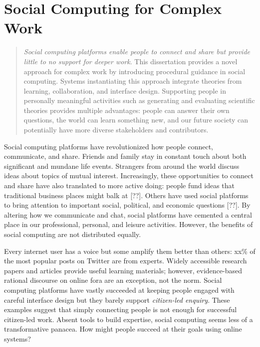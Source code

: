 \chapter{Social Computing for Complex Work}


\begin{quote}
\emph{Social computing platforms enable people to connect and share but provide little to no support for deeper work}. This dissertation provides a novel approach for complex work by introducing procedural guidance in social computing. Systems instantiating this approach integrate theories from learning, collaboration, and interface design. Supporting people in personally meaningful activities such as generating and evaluating scientific theories provides multiple advantages: people can answer their own questions, the world can learn something new, and our future society can potentially have more diverse stakeholders and contributors.
\end{quote}
\vspace{0.25in}

Social computing platforms have revolutionized how people connect, communicate, and share. Friends and family stay in constant touch about both significant and mundane life events. Strangers from around the world discuss ideas about topics of mutual interest. Increasingly, these opportunities to connect and share have also translated to more active doing: people fund ideas that traditional business places might balk at [??]. Others have used social platforms to bring attention to important social, political, and economic questions [??]. By altering how we communicate and chat, social platforms have cemented a central place in our professional, personal, and leisure activities. However, the benefits of social computing are not distributed equally. 

Every internet user has a voice but some amplify them better than others: xx\% of the most popular posts on Twitter are from experts. Widely accessible research papers and articles provide useful learning materials; however, evidence-based rational discourse on online fora are an exception, not the norm. Social computing platforms have vastly succeeded at keeping people engaged with careful interface design but they barely support \textit {citizen-led enquiry}. These examples suggest that simply connecting people is not enough for successful citizen-led work. Absent tools to build expertise, social computing seems less of a transformative panacea. How might people succeed at their goals using online systems?

